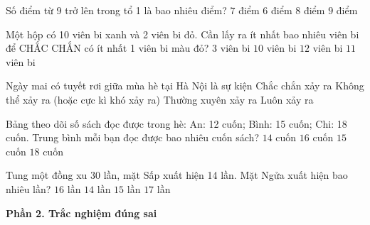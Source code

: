 \begin{ex} %
Số điểm từ 9 trở lên trong tổ 1 là bao nhiêu điểm?
\choice
{\True $7$ điểm}
{$6$ điểm}
{$8$ điểm}
{$9$ điểm}
\end{ex}

\begin{ex} %
Một hộp có 10 viên bi xanh và 2 viên bi đỏ. Cần lấy ra ít nhất bao nhiêu viên bi để CHẮC CHẮN có ít nhất 1 viên bi màu đỏ?
\choice
{$3$ viên bi}
{$10$ viên bi}
{$12$ viên bi}
{\True $11$ viên bi}
\end{ex}

\begin{ex} %
Ngày mai có tuyết rơi giữa mùa hè tại Hà Nội là sự kiện
\choice
{Chắc chắn xảy ra}
{\True Không thể xảy ra (hoặc cực kì khó xảy ra)}
{Thường xuyên xảy ra}
{Luôn xảy ra}
\end{ex}

\begin{ex} %
Bảng theo dõi số sách đọc được trong hè: An: 12 cuốn; Bình: 15 cuốn; Chi: 18 cuốn. Trung bình mỗi bạn đọc được bao nhiêu cuốn sách?
\choice
{$14$ cuốn}
{$16$ cuốn}
{\True $15$ cuốn}
{$18$ cuốn}
\end{ex}

\begin{ex} %
Tung một đồng xu 30 lần, mặt Sấp xuất hiện 14 lần. Mặt Ngửa xuất hiện bao nhiêu lần?
\choice
{\True $16$ lần}
{$14$ lần}
{$15$ lần}
{$17$ lần}
\end{ex}

\textbf{Phần 2. Trắc nghiệm đúng sai}

